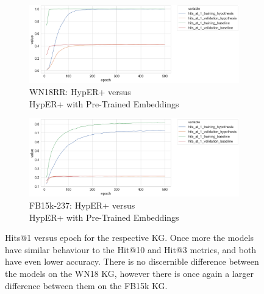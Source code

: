 \begin{figure}[H]
	\begin{subfigure}[b]{.5\linewidth}
   		\centering
    		\includegraphics[width=1.0\linewidth, height=0.6\linewidth]{WN18RR_hits_at_1_Results_ptwv}
		\captionsetup{justification=centering}
		\caption{WN18RR: HypER+ versus \\ HypER+ with Pre-Trained Embeddings}
	\end{subfigure}
	\begin{subfigure}[b]{.5\linewidth}
   		\centering
		\includegraphics[width=1.0\linewidth, height=0.6\linewidth]{FB15k-237_hits_at_1_Results_ptwv}
		\captionsetup{justification=centering}
		\caption{FB15k-237: HypER+ versus \\ HypER+ with Pre-Trained Embeddings}
	\end{subfigure}
	\captionsetup{justification=centering}
	\caption{Hits@1 versus epoch for the respective KG. Once more the models have similar behaviour to the Hit@10 and Hit@3 metrics, and both have even lower accuracy. There is no discernible difference between the models on the WN18 KG, however there is once again a larger difference between them on the FB15k KG. }
\end{figure}

